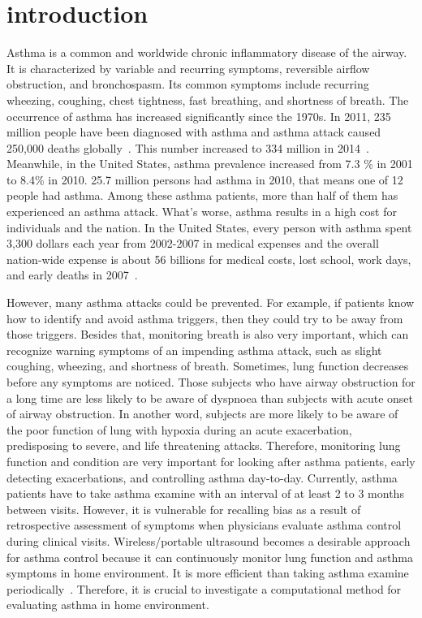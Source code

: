 \section{introduction} \label{sec.introduction}

Asthma is a common and worldwide chronic inflammatory disease of the airway. It is characterized by variable and recurring symptoms, reversible airflow obstruction, and bronchospasm. Its common symptoms include recurring wheezing, coughing, chest tightness, fast breathing, and shortness of breath. The occurrence of asthma has increased significantly since the 1970s. In 2011, 235 million people have been diagnosed with asthma and asthma attack caused 250,000 deaths globally~\cite{Varsha:2014}. This number increased to 334 million in 2014~\cite{Asthma:2014}. Meanwhile, in the United States, asthma prevalence increased from 7.3 \% in 2001 to 8.4\% in 2010. 25.7 million persons had asthma in 2010, that means one of 12 people had asthma. Among these asthma patients, more than half of them has experienced an asthma attack. What's worse, asthma results in a high cost for individuals and the nation. In the United States, every person with asthma spent 3,300 dollars each year from 2002-2007 in medical expenses and the overall nation-wide expense is about 56 billions for medical costs, lost school, work days, and early deaths in 2007~\cite{Vitalsigns:2011}.

However, many asthma attacks could be  prevented. For example, if patients know how to identify and avoid asthma triggers, then they could try to be away from those triggers. Besides that, monitoring breath is also very important, which can recognize warning symptoms of an impending asthma attack, such as slight coughing, wheezing, and shortness of breath. Sometimes, lung function decreases before any symptoms are noticed. Those subjects who have airway obstruction for a long time are less likely to be aware of dyspnoea than subjects with acute onset of airway obstruction. In another word, subjects are more likely to be aware of the poor function of lung with hypoxia during an acute exacerbation, predisposing to severe, and life threatening attacks. Therefore, monitoring lung function and condition are very important for looking after asthma patients, early detecting exacerbations, and controlling asthma day-to-day. Currently, asthma patients have to take asthma examine with an interval of at least 2 to 3 months between visits. However, it is vulnerable for recalling bias as a result of retrospective assessment of symptoms when physicians evaluate asthma control during clinical visits. Wireless/portable ultrasound  becomes a desirable approach for asthma control because it can continuously monitor lung function and asthma symptoms in home environment. It is more efficient than taking asthma examine periodically~\cite{Dillys:2014}. Therefore, it is crucial to investigate a computational method for evaluating asthma in home environment.

